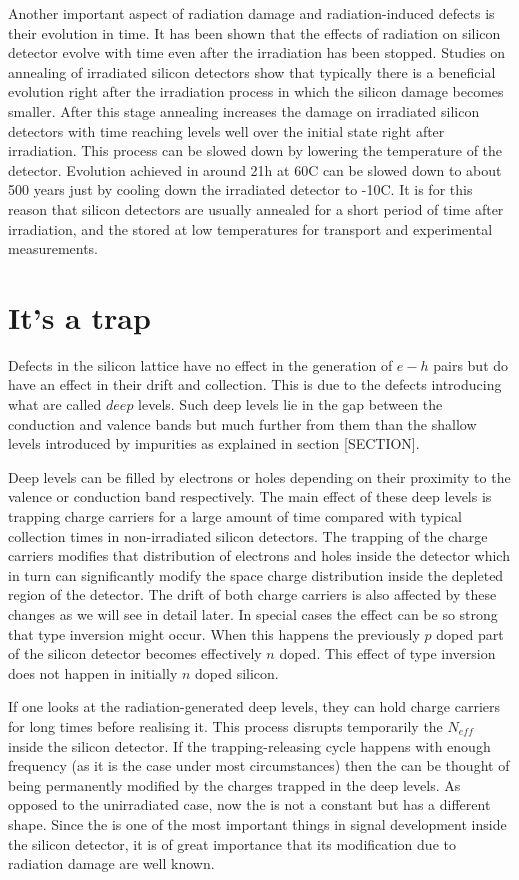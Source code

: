 Another important aspect of radiation damage and radiation-induced defects is their evolution in time. It has been shown that the effects of radiation on silicon detector evolve with time even after the irradiation has been stopped. Studies on annealing of irradiated silicon detectors show that typically there is a beneficial evolution right after the irradiation process in which the silicon damage becomes smaller. After this stage annealing increases the damage on irradiated silicon detectors with time reaching levels well over the initial state right after irradiation. This process can be slowed down by lowering the temperature of the detector. Evolution achieved in around 21h at 60C can be slowed down to about 500 years just by cooling down the irradiated detector to -10C. It is for this reason that silicon detectors are usually annealed for a short period of time after irradiation, and the stored at low temperatures for transport and experimental measurements.

\section{It's a trap}

Defects in the silicon lattice have no effect in the generation of $e-h$ pairs but do have an effect in their drift and collection. This is due to the defects introducing what are called $deep$ levels. Such deep levels lie in the gap between the conduction and valence bands but much further from them than the shallow levels introduced by impurities as explained in section [SECTION].

Deep levels can be filled by electrons or holes depending on their proximity to the valence or conduction band respectively. The main effect of these deep levels is trapping charge carriers for a large amount of time compared with typical collection times in non-irradiated silicon detectors. The trapping of the charge carriers modifies that distribution of electrons and holes inside the detector which in turn can significantly modify the space charge distribution inside the depleted region of the detector. The drift of both charge carriers is also affected by these changes as we will see in detail later. In special cases the effect can be so strong that type inversion might occur. When this happens the previously $p$ doped part of the silicon detector becomes effectively $n$ doped. This effect of type inversion does not happen in initially $n$ doped silicon.

If one looks at the radiation-generated deep levels, they can hold charge carriers for long times before realising it. This process disrupts temporarily the $N_{eff}$ inside the silicon detector. If the trapping-releasing cycle happens with enough frequency (as it is the case under most circumstances) then the \neff can be thought of being permanently modified by the charges trapped in the deep levels. As opposed to the unirradiated case, now the \neff is not a constant but has a different shape. Since the \neff is one of the most important things in signal development inside the silicon detector, it is of great importance that its modification due to radiation damage are well known.

